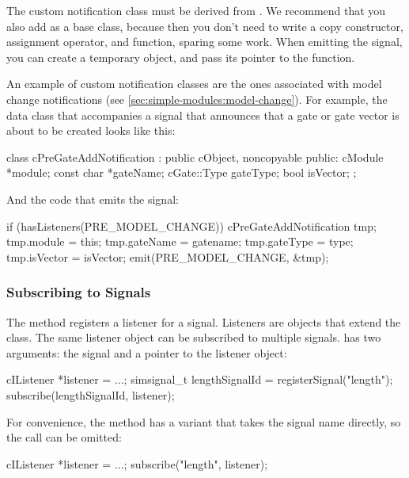 The custom notification class must be derived from .
We recommend that you also add  as a base class, because
then you don't need to write a copy constructor, assignment operator, and
 function, sparing some work. When emitting the signal, you
can create a temporary object, and pass its pointer to the 
function.

An example of custom notification classes are the ones associated with
model change notifications (see \ref{sec:simple-modules:model-change}).
For example, the data class that accompanies a signal that announces that a
gate or gate vector is about to be created looks like this:

\begin{cpp}
class cPreGateAddNotification : public cObject, noncopyable
{
  public:
    cModule *module;
    const char *gateName;
    cGate::Type gateType;
    bool isVector;
};
\end{cpp}

And the code that emits the signal:

\begin{cpp}
if (hasListeners(PRE_MODEL_CHANGE))
{
    cPreGateAddNotification tmp;
    tmp.module = this;
    tmp.gateName = gatename;
    tmp.gateType = type;
    tmp.isVector = isVector;
    emit(PRE_MODEL_CHANGE, &tmp);
}
\end{cpp}


\subsubsection{Subscribing to Signals}
\label{sec:simple-modules:subscribing-to-signals}

The  method registers a listener for a signal.
Listeners are objects that extend the  class.
The same listener object can be subscribed to multiple signals.
 has two arguments: the signal and a pointer to
the listener object:

\begin{cpp}
cIListener *listener = ...;
simsignal_t lengthSignalId = registerSignal("length");
subscribe(lengthSignalId, listener);
\end{cpp}

For convenience, the  method has a variant
that takes the signal name directly, so the 
call can be omitted:

\begin{cpp}
cIListener *listener = ...;
subscribe("length", listener);
\end{cpp}

